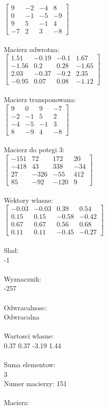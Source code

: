 \documentclass[a4paper,12pt]{article}
\begin{document}
$\begin{bmatrix} 9&-2&-4&8\\0&-1&-5&-9\\9&5&-1&4\\-7&2&3&-8 \end{bmatrix}$
\\
\\
Macierz odwrotna:\\

$\begin{bmatrix} 1.51&-0.19&-0.1&1.67\\-1.56&0.2&0.28&-1.65\\2.03&-0.37&-0.2&2.35\\-0.95&0.07&0.08&-1.12 \end{bmatrix}$
\\
\\
Macierz transponowana:\\

$\begin{bmatrix} 9&0&9&-7\\-2&-1&5&2\\-4&-5&-1&3\\8&-9&4&-8 \end{bmatrix}$
\\
\\
Macierz do potegi 3:\\

$\begin{bmatrix} -151&72&172&20\\-418&43&338&-34\\27&-326&-55&412\\85&-92&-120&9 \end{bmatrix}$
\\
\\
Wektory wlasne:\\

$\begin{bmatrix} -0.03&-0.03&0.39&0.54\\0.15&0.15&-0.58&-0.42\\0.67&0.67&0.56&0.68\\0.11&0.11&-0.45&-0.27 \end{bmatrix}$
\\
\\
Slad:\\
-1
\\
\\
Wyznacznik:\\
-257
\\
\\
Odwracalnosc:\\
Odwracalna
\\
\\
Wartosci wlasne:\\
0.37 0.37 -3.19 1.44
\\
\\
Suma elementow:\\
3
\\
\newpage
Numer macierzy:
151
\\
\\
Macierz:\\
\end{document}
